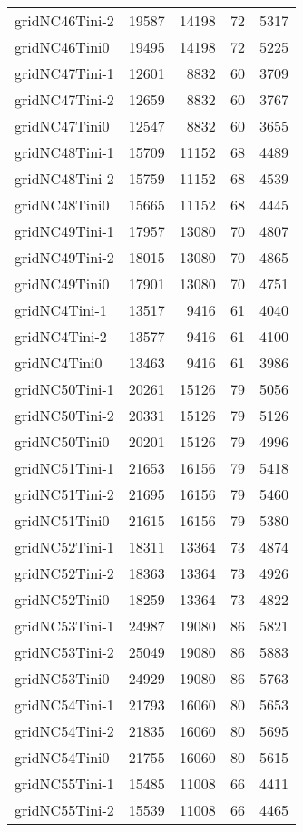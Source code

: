 \begin{longtable}{lrrrr}
gridNC46Tini-2 & 19587 & 14198 & 72 & 5317 \\
gridNC46Tini0 & 19495 & 14198 & 72 & 5225 \\
gridNC47Tini-1 & 12601 & 8832 & 60 & 3709 \\
gridNC47Tini-2 & 12659 & 8832 & 60 & 3767 \\
gridNC47Tini0 & 12547 & 8832 & 60 & 3655 \\
gridNC48Tini-1 & 15709 & 11152 & 68 & 4489 \\
gridNC48Tini-2 & 15759 & 11152 & 68 & 4539 \\
gridNC48Tini0 & 15665 & 11152 & 68 & 4445 \\
gridNC49Tini-1 & 17957 & 13080 & 70 & 4807 \\
gridNC49Tini-2 & 18015 & 13080 & 70 & 4865 \\
gridNC49Tini0 & 17901 & 13080 & 70 & 4751 \\
gridNC4Tini-1 & 13517 & 9416 & 61 & 4040 \\
gridNC4Tini-2 & 13577 & 9416 & 61 & 4100 \\
gridNC4Tini0 & 13463 & 9416 & 61 & 3986 \\
gridNC50Tini-1 & 20261 & 15126 & 79 & 5056 \\
gridNC50Tini-2 & 20331 & 15126 & 79 & 5126 \\
gridNC50Tini0 & 20201 & 15126 & 79 & 4996 \\
gridNC51Tini-1 & 21653 & 16156 & 79 & 5418 \\
gridNC51Tini-2 & 21695 & 16156 & 79 & 5460 \\
gridNC51Tini0 & 21615 & 16156 & 79 & 5380 \\
gridNC52Tini-1 & 18311 & 13364 & 73 & 4874 \\
gridNC52Tini-2 & 18363 & 13364 & 73 & 4926 \\
gridNC52Tini0 & 18259 & 13364 & 73 & 4822 \\
gridNC53Tini-1 & 24987 & 19080 & 86 & 5821 \\
gridNC53Tini-2 & 25049 & 19080 & 86 & 5883 \\
gridNC53Tini0 & 24929 & 19080 & 86 & 5763 \\
gridNC54Tini-1 & 21793 & 16060 & 80 & 5653 \\
gridNC54Tini-2 & 21835 & 16060 & 80 & 5695 \\
gridNC54Tini0 & 21755 & 16060 & 80 & 5615 \\
gridNC55Tini-1 & 15485 & 11008 & 66 & 4411 \\
gridNC55Tini-2 & 15539 & 11008 & 66 & 4465 \\

\end{longtable}
